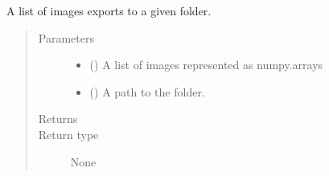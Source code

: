 \documentclass[letterpaper,10pt,english]{sphinxmanual}
\begin{document}

\begin{fulllineitems}
\label{\detokenize{api:readpyne.io.save_images}}
A list of images exports to a given folder.
\begin{quote}\begin{description}
\item[{Parameters}] \leavevmode\begin{itemize}
\item {} 
 () \textendash{} A list of images represented as numpy.arrays

\item {} 
 () \textendash{} A path to the folder.

\end{itemize}

\item[{Returns}] \leavevmode


\item[{Return type}] \leavevmode
None

\end{description}\end{quote}

\end{fulllineitems}

\end{document}
